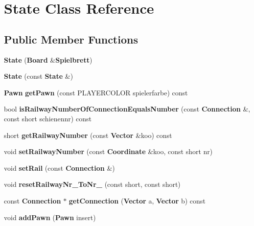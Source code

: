 \section{State Class Reference}
\label{class_state}
\subsection*{Public Member Functions}
\begin{DoxyCompactItemize}
\item 
{\bfseries State} ({\bf Board} \&{\bf Spielbrett})\label{class_state_ab8e8b562af12bba2ae71a14fcfd87673}

\item 
{\bfseries State} (const {\bf State} \&)\label{class_state_a5ca97340266d486dfa42225f19c40de3}

\item 
{\bf Pawn} {\bfseries get\-Pawn} (const P\-L\-A\-Y\-E\-R\-C\-O\-L\-O\-R spielerfarbe) const \label{class_state_a047b98fadf3b757656fa203e439d6c95}

\item 
bool {\bfseries is\-Railway\-Number\-Of\-Connection\-Equals\-Number} (const {\bf Connection} \&, const short schienennr) const \label{class_state_a0aab91520b80f52278908c673bb80779}

\item 
short {\bfseries get\-Railway\-Number} (const {\bf Vector} \&koo) const \label{class_state_a4ba85094883f4a79e0efd3cfc6088535}

\item 
void {\bfseries set\-Railway\-Number} (const {\bf Coordinate} \&koo, const short nr)\label{class_state_a170bfcb662e80c58f01608c441ddfce4}

\item 
void {\bfseries set\-Rail} (const {\bf Connection} \&)\label{class_state_ac05cee15165658aedfe46bca33e8436b}

\item 
void {\bfseries reset\-Railway\-Nr\-\_\-\-To\-Nr\-\_\-} (const short, const short)\label{class_state_a482b551469c15e5f88967ab6c42ca3dc}

\item 
const {\bf Connection} $\ast$ {\bfseries get\-Connection} ({\bf Vector} a, {\bf Vector} b) const \label{class_state_a720ae4c2d0f49932b0f117d9beb98863}

\item 
void {\bfseries add\-Pawn} ({\bf Pawn} insert)\label{class_state_a9a192466fc65d42a405b6c461f5ae1c7}


\end{DoxyCompactItemize}
